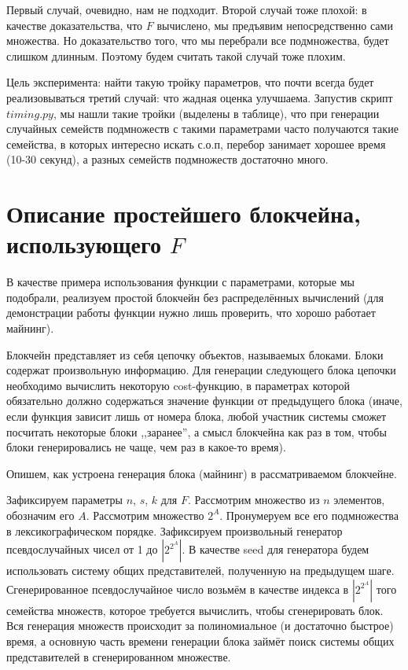 \documentclass{article}
\begin{document}
    Первый случай, очевидно, нам не подходит. Второй случай тоже плохой: в качестве доказательства, что $F$ вычислено, мы предъявим непосредственно сами множества. Но доказательство того, что мы перебрали все подмножества, будет слишком длинным. Поэтому будем считать такой случай тоже плохим.

    Цель эксперимента: найти такую тройку параметров, что почти всегда будет реализовываться третий случай: что жадная оценка улучшаема. Запустив скрипт $timing.py$, мы нашли такие тройки (выделены в таблице), что при генерации случайных семейств подмножеств с такими параметрами часто получаются такие семейства, в которых интересно искать с.о.п, перебор занимает хорошее время (10-30 секунд), а разных семейств подмножеств достаточно много.

\section{Описание простейшего блокчейна, использующего $F$}

    В качестве примера использования функции с параметрами, которые мы подобрали, реализуем простой блокчейн без распределённых вычислений (для демонстрации работы функции нужно лишь проверить, что хорошо работает майнинг).

    Блокчейн представляет из себя цепочку объектов, называемых блоками. Блоки содержат произвольную информацию. Для генерации следующего блока цепочки необходимо вычислить некоторую cost-функцию, в параметрах которой обязательно должно содержаться значение функции от предыдущего блока (иначе, если функция зависит лишь от номера блока, любой участник системы сможет посчитать некоторые блоки ,,заранее'', а смысл блокчейна как раз в том, чтобы блоки генерировались не чаще, чем раз в какое-то время).

    Опишем, как устроена генерация блока (майнинг) в рассматриваемом блокчейне. 

    Зафиксируем параметры $n$, $s$, $k$ для $F$. Рассмотрим множество из $n$ элементов, обозначим его $A$. Рассмотрим множество $2^A$. Пронумеруем все его подмножества в лексикографическом порядке. Зафиксируем произвольный генератор псевдослучайных чисел от 1 до $|2^{2^A}|$. В качестве seed для генератора будем использовать систему общих представителей, полученную на предыдущем шаге. Сгенерированное псевдослучайное число возьмём в качестве индекса в $|2^{2^A}|$ того семейства множеств, которое требуется вычислить, чтобы сгенерировать блок. Вся генерация множеств происходит за полиномиальное (и достаточно быстрое) время, а основную часть времени генерации блока займёт поиск системы общих представителей в сгенерированном множестве.
\end{document}
